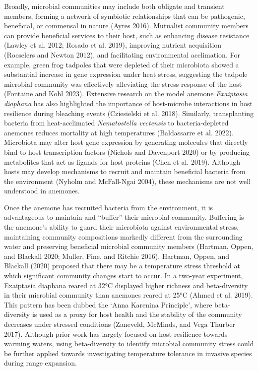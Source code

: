 \documentclass[
]{article}
\begin{document}
Broadly, microbial communities may include both obligate and transient
members, forming a network of symbiotic relationships that can be
pathogenic, beneficial, or commensal in nature (Ayres 2016). Mutualist
community members can provide beneficial services to their host, such as
enhancing disease resistance (Lawley et al. 2012; Rosado et al. 2019),
improving nutrient acquisition (Roeselers and Newton 2012), and
facilitating environmental acclimation. For example, green frog tadpoles
that were depleted of their microbiota showed a substantial increase in
gene expression under heat stress, suggesting the tadpole microbial
community was effectively alleviating the stress response of the host
(Fontaine and Kohl 2023). Extensive research on the model anemone
\emph{Exaiptasia diaphana} has also highlighted the importance of
host-microbe interactions in host resilience during bleaching events
(Cziesielski et al. 2018). Similarly, transplanting bacteria from
heat-acclimated \emph{Nematostella vectensis} to bacteria-depleted
anemones reduces mortality at high temperatures (Baldassarre et al.
2022). Microbiota may alter host gene expression by generating molecules
that directly bind to host transcription factors (Nichols and Davenport
2020) or by producing metabolites that act as ligands for host proteins
(Chen et al. 2019). Although hosts may develop mechanisms to recruit and
maintain beneficial bacteria from the environment (Nyholm and
McFall-Ngai 2004), these mechanisms are not well understood in anemones.

Once the anemone has recruited bacteria from the environment, it is
advantageous to maintain and ``buffer'' their microbial community.
Buffering is the anemone's ability to guard their microbiota against
environmental stress, maintaining community compositions markedly
different from the surrounding water and preserving beneficial microbial
community members (Hartman, Oppen, and Blackall 2020; Muller, Fine, and
Ritchie 2016). Hartman, Oppen, and Blackall (2020) proposed that there
may be a temperature stress threshold at which significant community
changes start to occur. In a two-year experiment, Exaiptasia diaphana
reared at 32°C displayed higher richness and beta-diversity in their
microbial community than anemones reared at 25°C (Ahmed et al. 2019).
This pattern has been dubbed the `Anna Karenina Principle', where
beta-diversity is used as a proxy for host health and the stability of
the community decreases under stressed conditions (Zaneveld, McMinds,
and Vega Thurber 2017). Although prior work has largely focused on host
resilience towards warming waters, using beta-diversity to identify
microbial community stress could be further applied towards
investigating temperature tolerance in invasive species during range
expansion.
\end{document}

